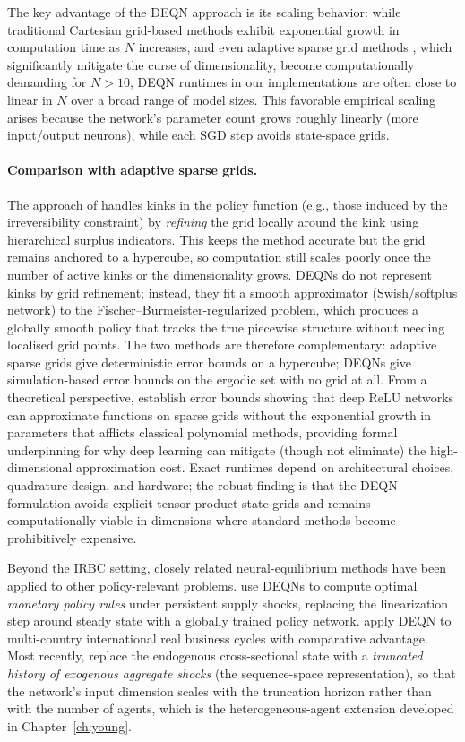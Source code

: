 \documentclass[11pt,a4paper]{report}
\begin{document}
The key advantage of the DEQN approach is its scaling behavior: while traditional Cartesian grid-based methods \citep{judd1998numerical} exhibit exponential growth in computation time as $N$ increases, and even adaptive sparse grid methods \citep{ECTA:ECTA1716}, which significantly mitigate the curse of dimensionality, become computationally demanding for $N > 10$, DEQN runtimes in our implementations are often close to linear in $N$ over a broad range of model sizes.  This favorable empirical scaling arises because the network's parameter count grows roughly linearly (more input/output neurons), while each SGD step avoids state-space grids.

\paragraph{Comparison with adaptive sparse grids.}  The approach of \citet{ECTA:ECTA1716} handles kinks in the policy function (e.g., those induced by the irreversibility constraint) by \emph{refining} the grid locally around the kink using hierarchical surplus indicators.  This keeps the method accurate but the grid remains anchored to a hypercube, so computation still scales poorly once the number of active kinks or the dimensionality grows.  DEQNs do not represent kinks by grid refinement; instead, they fit a smooth approximator (Swish/softplus network) to the Fischer--Burmeister-regularized problem, which produces a globally smooth policy that tracks the true piecewise structure without needing localised grid points.  The two methods are therefore complementary: adaptive sparse grids give deterministic error bounds on a hypercube; DEQNs give simulation-based error bounds on the ergodic set with no grid at all.  From a theoretical perspective, \citet{montanelli2019deep} establish error bounds showing that deep ReLU networks can approximate functions on sparse grids without the exponential growth in parameters that afflicts classical polynomial methods, providing formal underpinning for why deep learning can mitigate (though not eliminate) the high-dimensional approximation cost.  Exact runtimes depend on architectural choices, quadrature design, and hardware; the robust finding is that the DEQN formulation avoids explicit tensor-product state grids and remains computationally viable in dimensions where standard methods become prohibitively expensive.

Beyond the IRBC setting, closely related neural-equilibrium methods have been applied to other policy-relevant problems.  \citet{nuno2024monetary} use DEQNs to compute optimal \emph{monetary policy rules} under persistent supply shocks, replacing the linearization step around steady state with a globally trained policy network.  \citet{bretscherRicardianBusinessCycles2022} apply DEQN to multi-country international real business cycles with comparative advantage.  Most recently, \citet{azinovicyangzemlicka2025sequencespace} replace the endogenous cross-sectional state with a \emph{truncated history of exogenous aggregate shocks} (the sequence-space representation), so that the network's input dimension scales with the truncation horizon rather than with the number of agents, which is the heterogeneous-agent extension developed in Chapter~\ref{ch:young}.
\end{document}
